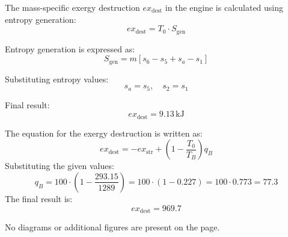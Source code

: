 The mass-specific exergy destruction \( ex_{\text{dest}} \) in the engine is calculated using entropy generation:  
\[
ex_{\text{dest}} = T_0 \cdot S_{\text{gen}}
\]  

Entropy generation is expressed as:  
\[
S_{\text{gen}} = m \left[ s_6 - s_5 + s_a - s_1 \right]
\]  

Substituting entropy values:  
\[
s_a = s_5, \quad s_2 = s_1
\]  

Final result:  
\[
ex_{\text{dest}} = 9.13 \, \text{kJ}
\]

The equation for the exergy destruction is written as:  
\[
ex_{\text{dest}} = -ex_{\text{str}} + \left(1 - \frac{T_0}{T_B}\right) q_B
\]  
Substituting the given values:  
\[
q_B = 100 \cdot \left(1 - \frac{293.15}{1289}\right) = 100 \cdot (1 - 0.227) = 100 \cdot 0.773 = 77.3
\]  
The final result is:  
\[
ex_{\text{dest}} = 969.7
\]  

No diagrams or additional figures are present on the page.